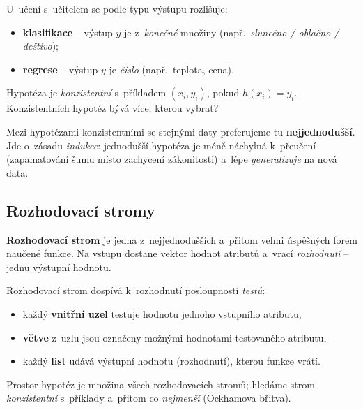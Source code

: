 \begin{intuice}
U~učení s~učitelem se podle typu výstupu rozlišuje:
\begin{itemize}
  \item \textbf{klasifikace} -- výstup $y$ je z~\emph{konečné} množiny (např.\ \emph{slunečno / oblačno / deštivo});
  \item \textbf{regrese} -- výstup $y$ je \emph{číslo} (např.\ teplota, cena).
\end{itemize}
Hypotéza je \emph{konzistentní} s~příkladem $(x_i,y_i)$, pokud $h(x_i)=y_i$. Konzistentních hypotéz bývá více; kterou vybrat?
\end{intuice}

\begin{definice}
Mezi hypotézami konzistentními se stejnými daty preferujeme tu \textbf{nejjednodušší}. Jde o~zásadu \emph{indukce}: jednodušší hypotéza je méně náchylná k~přeučení (zapamatování šumu místo zachycení zákonitosti) a~lépe \emph{generalizuje} na nová data.
\end{definice}

\subsection{Rozhodovací stromy}

\textbf{Rozhodovací strom} je jedna z~nejjednodušších a~přitom velmi úspěšných forem naučené funkce. Na vstupu dostane vektor hodnot atributů a~vrací \emph{rozhodnutí} -- jednu výstupní hodnotu.

\begin{definice}
Rozhodovací strom dospívá k~rozhodnutí posloupností \emph{testů}:
\begin{itemize}
  \item každý \textbf{vnitřní uzel} testuje hodnotu jednoho vstupního atributu,
  \item \textbf{větve} z~uzlu jsou označeny možnými hodnotami testovaného atributu,
  \item každý \textbf{list} udává výstupní hodnotu (rozhodnutí), kterou funkce vrátí.
\end{itemize}
Prostor hypotéz je množina všech rozhodovacích stromů; hledáme strom \emph{konzistentní} s~příklady a~přitom co \emph{nejmenší} (Ockhamova břitva).
\end{definice}

